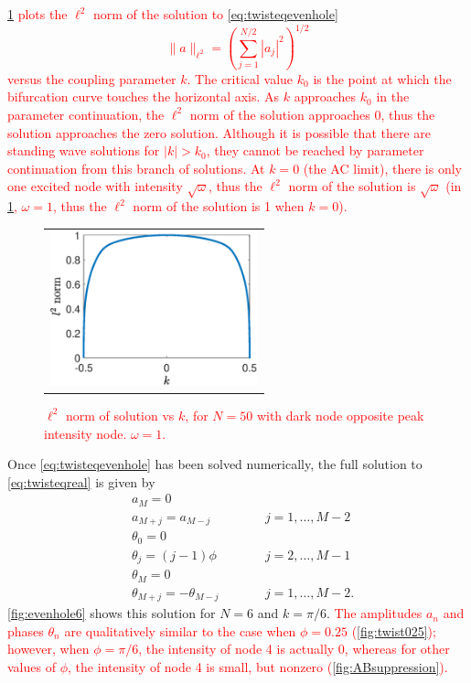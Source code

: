 \documentclass[reprint, amsmath,amssymb,aps,pra]{revtex4-2}
\renewcommand{\revised}[1]{ \textcolor{red}{#1} }
\begin{document}
\revised{
\cref{fig:evenbif} plots the $\ell^2$ norm of the solution to \cref{eq:twisteqevenhole}
\begin{equation}
\| a \|_{\ell^2} = \left( \sum_{j=1}^{N/2} |a_j|^2 \right)^{1/2}
\end{equation}
 versus the coupling parameter $k$. The critical value $k_0$ is the point at which the bifurcation curve touches the horizontal axis. As $k$ approaches $k_0$ in the parameter continuation, the $\ell^2$ norm of the solution approaches 0, thus the solution approaches the zero solution. Although it is possible that there are standing wave solutions for $|k| > k_0$, they cannot be reached by parameter continuation from this branch of solutions. At $k = 0$ (the AC limit), there is only one excited node with intensity $\sqrt{\omega}$, thus the $\ell^2$ norm of the solution is $\sqrt{\omega}$ (in \cref{fig:evenbif}, $\omega = 1$, thus the $\ell^2$ norm of the solution is 1 when $k = 0$).
\begin{figure}
\begin{center}
\begin{tabular}{c}
\includegraphics[width=6cm]{evenbif50.eps} 
\end{tabular}
\end{center}
\caption{$\ell^2$ norm of solution vs $k$, for $N = 50$ with dark node opposite peak intensity node. $\omega = 1$.}
\label{fig:evenbif}
\end{figure}
}

Once \cref{eq:twisteqevenhole} has been solved numerically, the full solution to \cref{eq:twisteqreal} is given by
\begin{align*}
&a_M = 0 \\
&a_{M+j} = a_{M-j} && \qquad j = 1, \dots, M-2 \\
&\theta_0 = 0 \\
&\theta_j = (j-1)\phi && \qquad  j = 2, \dots, M-1 \\
&\theta_M = 0 \\
&\theta_{M+j} = -\theta_{M-j} && \qquad j = 1, \dots, M-2.
\end{align*}
\cref{fig:evenhole6} shows this solution for $N=6$ and $k=\pi/6$. \revised{The amplitudes $a_n$ and phases $\theta_n$ are qualitatively similar to the case when $\phi = 0.25$ (\cref{fig:twist025}); however, when $\phi = \pi/6$, the intensity of node 4 is actually 0, whereas for other values of $\phi$, the intensity of node 4 is small, but nonzero (\cref{fig:ABsuppression}). }
\end{document}

